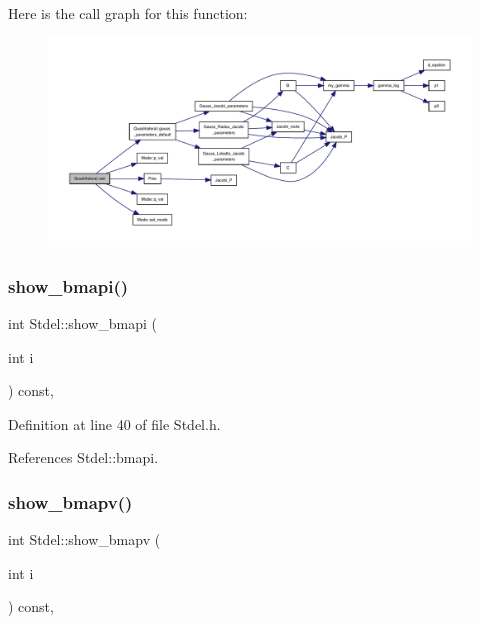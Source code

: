 Here is the call graph for this function\+:
\nopagebreak
\begin{figure}[H]
\begin{center}
\leavevmode
\includegraphics[width=350pt]{classQuadrilateral_a369e691d1ae71d00f9474078d176f032_cgraph}
\end{center}
\end{figure}
\mbox{\label{classStdel_ad3a0646ad7ec2567e46da36285dee331}} 
\subsubsection{\texorpdfstring{show\+\_\+bmapi()}{show\_bmapi()}}
{\footnotesize\ttfamily int Stdel\+::show\+\_\+bmapi (\begin{DoxyParamCaption}\item[{int}]{i }\end{DoxyParamCaption}) const\hspace{0.3cm}{\ttfamily [inline]}, {\ttfamily [inherited]}}



Definition at line 40 of file Stdel.\+h.



References Stdel\+::bmapi.

\mbox{\label{classStdel_ac8787dabfb1d767b89e39806522c1161}} 
\subsubsection{\texorpdfstring{show\+\_\+bmapv()}{show\_bmapv()}}
{\footnotesize\ttfamily int Stdel\+::show\+\_\+bmapv (\begin{DoxyParamCaption}\item[{int}]{i }\end{DoxyParamCaption}) const\hspace{0.3cm}{\ttfamily [inline]}, {\ttfamily [inherited]}}



